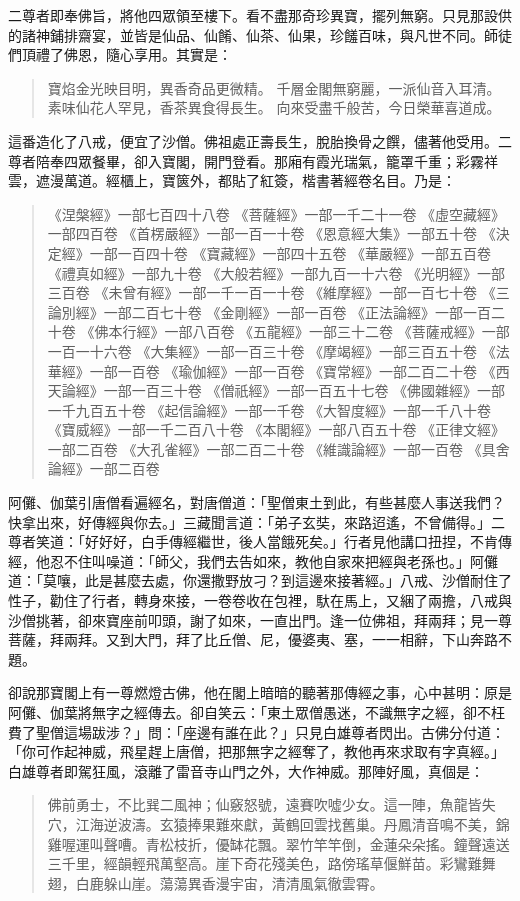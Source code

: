 二尊者即奉佛旨，將他四眾領至樓下。看不盡那奇珍異寶，擺列無窮。只見那設供的諸神鋪排齋宴，並皆是仙品、仙餚、仙茶、仙果，珍饈百味，與凡世不同。師徒們頂禮了佛恩，隨心享用。其實是：
\begin{quote}
寶焰金光映目明，異香奇品更微精。
千層金閣無窮麗，一派仙音入耳清。
素味仙花人罕見，香茶異食得長生。
向來受盡千般苦，今日榮華喜道成。
\end{quote}

這番造化了八戒，便宜了沙僧。佛祖處正壽長生，脫胎換骨之饌，儘著他受用。二尊者陪奉四眾餐畢，卻入寶閣，開門登看。那廂有霞光瑞氣，籠罩千重；彩霧祥雲，遮漫萬道。經櫃上，寶篋外，都貼了紅簽，楷書著經卷名目。乃是：
\begin{quote}
《涅槃經》一部七百四十八卷
《菩薩經》一部一千二十一卷
《虛空藏經》一部四百卷
《首楞嚴經》一部一百一十卷
《恩意經大集》一部五十卷
《決定經》一部一百四十卷
《寶藏經》一部四十五卷
《華嚴經》一部五百卷
《禮真如經》一部九十卷
《大般若經》一部九百一十六卷
《光明經》一部三百卷
《未曾有經》一部一千一百一十卷
《維摩經》一部一百七十卷
《三論別經》一部二百七十卷
《金剛經》一部一百卷
《正法論經》一部一百二十卷
《佛本行經》一部八百卷
《五龍經》一部三十二卷
《菩薩戒經》一部一百一十六卷
《大集經》一部一百三十卷
《摩竭經》一部三百五十卷
《法華經》一部一百卷
《瑜伽經》一部一百卷
《寶常經》一部二百二十卷
《西天論經》一部一百三十卷
《僧祇經》一部一百五十七卷
《佛國雜經》一部一千九百五十卷
《起信論經》一部一千卷
《大智度經》一部一千八十卷
《寶威經》一部一千二百八十卷
《本閣經》一部八百五十卷
《正律文經》一部二百卷
《大孔雀經》一部二百二十卷
《維識論經》一部一百卷
《具舍論經》一部二百卷
\end{quote}

阿儺、伽葉引唐僧看遍經名，對唐僧道：「聖僧東土到此，有些甚麼人事送我們？快拿出來，好傳經與你去。」三藏聞言道：「弟子玄奘，來路迢遙，不曾備得。」二尊者笑道：「好好好，白手傳經繼世，後人當餓死矣。」行者見他講口扭捏，不肯傳經，他忍不住叫噪道：「師父，我們去告如來，教他自家來把經與老孫也。」阿儺道：「莫嚷，此是甚麼去處，你還撒野放刁？到這邊來接著經。」八戒、沙僧耐住了性子，勸住了行者，轉身來接，一卷卷收在包裡，馱在馬上，又綑了兩擔，八戒與沙僧挑著，卻來寶座前叩頭，謝了如來，一直出門。逢一位佛祖，拜兩拜；見一尊菩薩，拜兩拜。又到大門，拜了比丘僧、尼，優婆夷、塞，一一相辭，下山奔路不題。

卻說那寶閣上有一尊燃燈古佛，他在閣上暗暗的聽著那傳經之事，心中甚明：原是阿儺、伽葉將無字之經傳去。卻自笑云：「東土眾僧愚迷，不識無字之經，卻不枉費了聖僧這場跋涉？」問：「座邊有誰在此？」只見白雄尊者閃出。古佛分付道：「你可作起神威，飛星趕上唐僧，把那無字之經奪了，教他再來求取有字真經。」白雄尊者即駕狂風，滾離了雷音寺山門之外，大作神威。那陣好風，真個是：
\begin{quote}
佛前勇士，不比巽二風神；仙竅怒號，遠賽吹噓少女。這一陣，魚龍皆失穴，江海逆波濤。玄猿捧果難來獻，黃鶴回雲找舊巢。丹鳳清音鳴不美，錦雞喔運叫聲嘈。青松枝折，優缽花飄。翠竹竿竿倒，金蓮朵朵搖。鐘聲遠送三千里，經韻輕飛萬壑高。崖下奇花殘美色，路傍瑤草偃鮮苗。彩鸞難舞翅，白鹿躲山崖。蕩蕩異香漫宇宙，清清風氣徹雲霄。
\end{quote}

